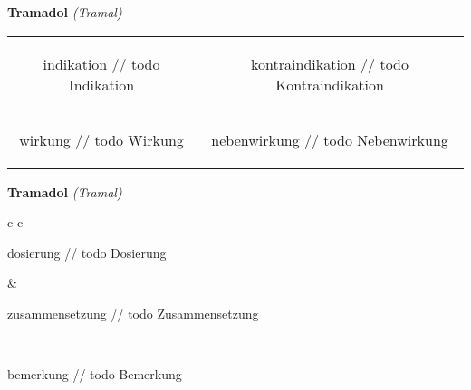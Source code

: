 \documentclass[12pt]{beamer}
\begin{document}
\begin{frame}{
    \textbf{Tramadol}
    \textit{(Tramal)}
}
    \begin{tabular}{c c}
        \begin{beamercolorbox}[wd=\boxwidth\textwidth,ht=\boxheight\textheight,sep=1em]{indikation}
        // todo Indikation
        \end{beamercolorbox} & 
        \begin{beamercolorbox}[wd=\boxwidth\textwidth,ht=\boxheight\textheight,sep=1em]{kontraindikation}
        // todo Kontraindikation 
        \end{beamercolorbox} \\
        \begin{beamercolorbox}[wd=\boxwidth\textwidth,ht=\boxheight\textheight,sep=1em]{wirkung}
        // todo Wirkung
        \end{beamercolorbox} & 
        \begin{beamercolorbox}[wd=\boxwidth\textwidth,ht=\boxheight\textheight,sep=1em]{nebenwirkung}
        // todo Nebenwirkung
        \end{beamercolorbox} \\
    \end{tabular}
\end{frame}

\begin{frame}{
    \textbf{Tramadol}
    \textit{(Tramal)}
}
    \begin{tabular}{c c}
        \begin{beamercolorbox}[wd=\boxwidth\textwidth,ht=\boxheight\textheight,sep=1em]{dosierung}
        // todo Dosierung
        \end{beamercolorbox} & 
        \begin{beamercolorbox}[wd=\boxwidth\textwidth,ht=\boxheight\textheight,sep=1em]{zusammensetzung}
        // todo Zusammensetzung
        \end{beamercolorbox} \\
        \begin{beamercolorbox}[wd=\textwidth,ht=\boxheight\textheight,sep=1em]{bemerkung}
        // todo Bemerkung
        \end{beamercolorbox} \\
    \end{tabular}
\end{frame}
\end{document}
